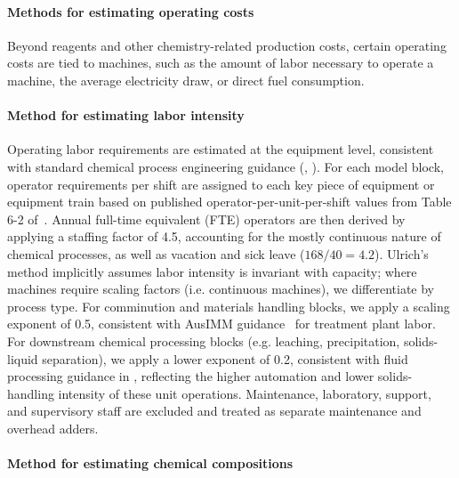 \documentclass{article}
\renewcommand\_{\textunderscore\allowbreak}
\begin{document}
\paragraph{Methods for estimating operating costs}\leavevmode\par

Beyond reagents and other chemistry-related production costs, certain operating costs are tied to machines, such as the amount of labor necessary to operate a machine, the average electricity draw, or direct fuel consumption. 

\paragraph{Method for estimating labor intensity}\label{app:04-methods-machineblocks-labor}\leavevmode\par

Operating labor requirements are estimated at the equipment level, consistent with standard chemical process engineering guidance (\citet{ulrichGuideChemicalEngineering1984}, \citet{turtonAnalysisSynthesisDesign2009}). For each model block, operator requirements per shift are assigned to each key piece of equipment or equipment train based on published operator-per-unit-per-shift values from Table 6-2 of~\citet{ulrichGuideChemicalEngineering1984}. Annual full-time equivalent (FTE) operators are then derived by applying a staffing factor of 4.5, accounting for the mostly continuous nature of chemical processes, as well as vacation and sick leave ($168 / 40 = 4.2$). Ulrich's method implicitly assumes labor intensity is invariant with capacity; where machines require scaling factors (i.e. continuous machines), we differentiate by process type. For comminution and materials handling blocks, we apply a scaling exponent of 0.5, consistent with AusIMM guidance~\cite{ausimmMonograph27Cost} for treatment plant labor. For downstream chemical processing blocks (e.g. leaching, precipitation, solids-liquid separation), we apply a lower exponent of 0.2, consistent with fluid processing guidance in \citet{petersPlantDesignEconomics1991}, reflecting the higher automation and lower solids-handling intensity of these unit operations. Maintenance, laboratory, support, and supervisory staff are excluded and treated as separate maintenance and overhead adders. 

\paragraph{Method for estimating chemical compositions}\label{app:04-methods-modelblocks-oreconc}\leavevmode\par
\end{document}
